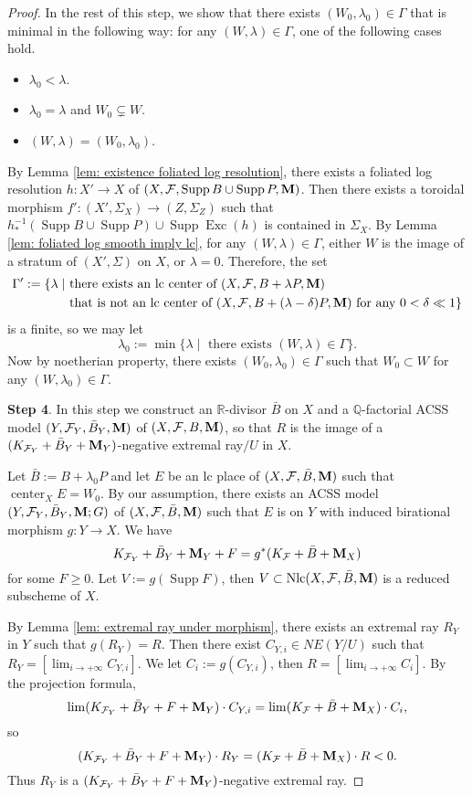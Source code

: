 \documentclass[11pt]{amsart}
\numberwithin{equation}{section}
\newcommand{\Mm}{{\bf{M}}}
\newcommand{\Qq}{\mathbb{Q}}
\newcommand{\Rr}{\mathbb{R}}
\newcommand{\Center}{\operatorname{center}}
\newcommand{\Exc}{\operatorname{Exc}}
\newcommand{\Supp}{\operatorname{Supp}}
\newcommand{\Nlc}{\operatorname{Nlc}}
\newcommand{\Ff}{\mathcal{F}}
\newcommand{\Ii}{\Gamma}
\theoremstyle{definition}
\theoremstyle{definition}
\theoremstyle{definition}
\begin{document}
\begin{proof}
In the rest of this step, we show that there exists $(W_0,\lambda_0)\in\Ii$ that is minimal in the following way: for any $(W,\lambda)\in\Ii$, one of the following cases hold.
\begin{itemize}
\item $\lambda_0<\lambda$.
\item $\lambda_0=\lambda$ and $W_0\subsetneq W$.
\item  $(W,\lambda)=(W_0,\lambda_0)$.
\end{itemize}
By Lemma \ref{lem: existence foliated log resolution}, there exists a foliated log resolution $h: X'\rightarrow X$ of $(X,\Ff,\Supp B\cup\Supp P,\Mm)$. Then there exists a toroidal morphism $f': (X',\Sigma_X)\rightarrow (Z,\Sigma_Z)$ such that $h^{-1}_*(\Supp B\cup\Supp P)\cup\Supp\Exc(h)$ is contained in $\Sigma_X$. By Lemma \ref{lem: foliated log smooth imply lc}, for any $(W,\lambda)\in\Ii$, either $W$ is the image of a stratum of $(X',\Sigma)$ on $X$, or $\lambda=0$. Therefore, the set
\begin{align*}
    \Ii':=\{\lambda\mid& \text{ there exists an lc center of }(X,\Ff,B+\lambda P,\Mm)\\
    & \text{ that is not an lc center of }(X,\Ff,B+(\lambda-\delta)P,\Mm) \text{ for any }0<\delta\ll 1\}
\end{align*}
is a finite, so we may let
$$\lambda_0:=\min\{\lambda\mid \text{ there exists }(W,\lambda)\in\Ii\}.$$
Now by noetherian property, there exists $(W_0,\lambda_0)\in\Ii$ such that $W_0\subset W$ for any $(W,\lambda_0)\in\Ii$. 

\medskip

\noindent\textbf{Step 4}. In this step we construct an $\Rr$-divisor $\bar B$ on $X$ and a $\Qq$-factorial ACSS model $(Y,\Ff_Y,\bar B_Y,\Mm)$ of $(X,\Ff,B,\Mm)$, so that $R$ is the image of a $(K_{\Ff_Y}+\bar B_Y+\Mm_Y)$-negative extremal ray$/U$ in $X$.

Let $\bar B:=B+\lambda_0P$ and let $E$ be an lc place of $(X,\Ff,\bar B,\Mm)$ such that $\Center_XE=W_0$. By our assumption, there exists an ACSS model $(Y,\Ff_Y,\bar B_Y,\Mm;G)$ of $(X,\Ff,\bar B,\Mm)$ such that $E$ is on $Y$ with induced birational morphism $g: Y\rightarrow X$. We have
$$K_{\Ff_Y}+\bar B_Y+\Mm_Y+F=g^*(K_{\Ff}+\bar B+\Mm_X)$$
for some $F\geq 0$. Let $V:=g(\Supp F)$, then $V\subset\Nlc(X,\Ff,\bar B,\Mm)$ is a reduced subscheme of $X$.

By Lemma \ref{lem: extremal ray under morphism}, there exists an extremal ray $R_Y$ in $Y$ such that $g(R_Y)=R$. Then there exist $C_{Y,i}\in NE(Y/U)$ such that $R_Y=[\lim_{i\rightarrow+\infty} C_{Y,i}]$. We let $C_i:=g(C_{Y,i})$, then $R=[\lim_{i\rightarrow+\infty} C_{i}]$. By the projection formula,
$$\lim (K_{\Ff_Y}+\bar B_Y+F+\Mm_Y)\cdot C_{Y,i}=\lim (K_{\Ff}+\bar B+\Mm_X)\cdot C_i,$$
so
$$(K_{\Ff_Y}+\bar B_Y+F+\Mm_Y)\cdot R_Y=(K_{\Ff}+\bar B+\Mm_X)\cdot R<0.$$
Thus $R_Y$ is a $(K_{\Ff_Y}+\bar B_Y+F+\Mm_Y)$-negative extremal ray. 


\end{proof}
\end{document}
